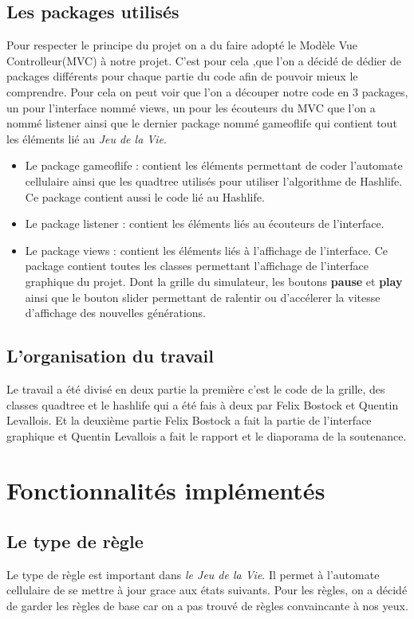 \documentclass{article}
\begin{document}
\subsection{Les packages utilisés}
Pour respecter le principe du projet on a du faire adopté le Modèle Vue Controlleur(MVC) à notre projet.
C'est pour cela ,que l'on a décidé de dédier de packages différents pour chaque partie du code afin de pouvoir mieux le comprendre. Pour cela on peut voir que l'on a découper notre code en 3 packages, un pour l'interface nommé views, un pour les écouteurs du MVC que l'on a nommé listener ainsi que le dernier package nommé gameoflife qui contient tout les éléments lié au \textit{Jeu de la Vie}. 
\begin{itemize}
    \item Le package gameoflife : contient les éléments permettant de coder l'automate cellulaire ainsi que les quadtree utilisés pour utiliser l'algorithme de Hashlife. Ce package contient aussi le code lié au Hashlife.
    \item Le package listener : contient les éléments liés au écouteurs de l'interface.
    \item Le package views : contient les éléments liés à l'affichage de l'interface. Ce package contient toutes les classes permettant l'affichage de l'interface graphique du projet. Dont la grille du simulateur, les boutons \textbf{pause} et \textbf{play} ainsi que le bouton slider permettant de ralentir ou d'accélerer la vitesse d'affichage des nouvelles générations. 
\end{itemize}

\subsection{L'organisation du travail}
Le travail a été divisé en deux partie la première c'est le code de la grille, des classes quadtree et le hashlife qui a été fais à deux par Felix Bostock et Quentin Levallois. Et la deuxième partie Felix Bostock a fait la partie de l'interface graphique et Quentin Levallois a fait le rapport et le diaporama de la soutenance.


\section{Fonctionnalités implémentés}
\subsection{Le type de règle}
Le type de règle est important dans \textit{le Jeu de la Vie}. Il permet à l'automate cellulaire de se mettre à jour grace aux états suivants. Pour les règles, on a décidé de garder les règles de base car on a pas trouvé de règles convaincante à nos yeux.  
\end{document}
